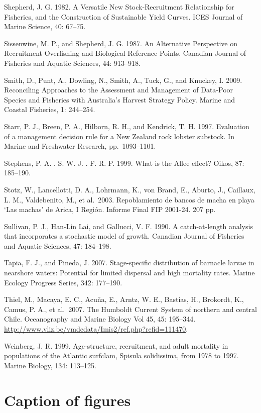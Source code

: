 \documentclass[12pt]{article}
\begin{document}
Shepherd, J. G. 1982. A Versatile New Stock-Recruitment Relationship for
Fisheries, and the Construction of Sustainable Yield Curves. ICES
Journal of Marine Science, 40: 67--75.

Sissenwine, M. P., and Shepherd, J. G. 1987. An Alternative Perspective
on Recruitment Overfishing and Biological Reference Points. Canadian
Journal of Fisheries and Aquatic Sciences, 44: 913--918.

Smith, D., Punt, A., Dowling, N., Smith, A., Tuck, G., and Knuckey, I.
2009. Reconciling Approaches to the Assessment and Management of
Data-Poor Species and Fisheries with Australia's Harvest Strategy
Policy. Marine and Coastal Fisheries, 1: 244--254.

Starr, P. J., Breen, P. A., Hilborn, R. H., and Kendrick, T. H. 1997.
Evaluation of a management decision rule for a New Zealand rock lobster
substock. In Marine and Freshwater Research, pp.~1093--1101.

Stephens, P. A. . S. W. J. . F. R. P. 1999. What is the Allee effect?
Oikos, 87: 185--190.

Stotz, W., Lancellotti, D. A., Lohrmann, K., von Brand, E., Aburto, J.,
Caillaux, L. M., Valdebenito, M., et al.~2003. Repoblamiento de bancos
de macha en playa `Las machas' de Arica, I Región. Informe Final FIP
2001-24. 207 pp.

Sullivan, P. J., Han-Lin Lai, and Gallucci, V. F. 1990. A
catch-at-length analysis that incorporates a stochastic model of growth.
Canadian Journal of Fisheries and Aquatic Sciences, 47: 184--198.

Tapia, F. J., and Pineda, J. 2007. Stage-specific distribution of
barnacle larvae in nearshore waters: Potential for limited dispersal and
high mortality rates. Marine Ecology Progress Series, 342: 177--190.

Thiel, M., Macaya, E. C., Acuña, E., Arntz, W. E., Bastias, H.,
Brokordt, K., Camus, P. A., et al.~2007. The Humboldt Current System of
northern and central Chile. Oceanography and Marine Biology Vol 45, 45:
195--344. \url{http://www.vliz.be/vmdcdata/Imis2/ref.php?refid=111470}.

Weinberg, J. R. 1999. Age-structure, recruitment, and adult mortality in
populations of the Atlantic surfclam, Spisula solidissima, from 1978 to
1997. Marine Biology, 134: 113--125.

\hypertarget{caption-of-figures}{%
\section{Caption of figures}\label{caption-of-figures}}
\end{document}
